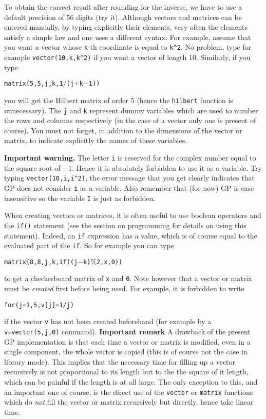 To obtain the correct result after rounding for the inverse, we have to use
a default precision of 56 digits (try it).
\smallskip
Although vectors and matrices can be entered manually, by typing explicitly
their elements, very often the elements satisfy a simple law and one uses a
different syntax. For example, assume that you want a vector whose {\tt k}-th
coordinate is equal to {\tt k\^{}2}. No problem, type for example
{\tt vector(10,k,k\^{}2)} if you want a vector of length 10. Similarly, if
you type 

\centerline{{\tt matrix(5,5,j,k,1$/$(j$+$k$-$1))}}

\noindent you will get the Hilbert
matrix of order 5 (hence the {\tt hilbert} function is unnecessary).
The {\tt j} and {\tt k} represent dummy variables which are used to number
the rows and columns respectively (in the case of a vector only one is present
of course). You must not forget, in addition to the dimensions of the vector
or matrix, to indicate explicitly the names of these variables.

{\bf Important warning.} The letter {\tt i} is reserved for the complex number
equal to the square root of $-1$. Hence it is absolutely forbidden to use it
as a variable. Try typing {\tt vector(10,i,i\^{}2)}, the error message that you
get clearly indicates that GP does not consider {\tt i} as a variable.
Also remember that (for now) GP is case insensitive so the variable {\tt I} is
just as forbidden.

When creating vectors or matrices, it is often useful to use boolean operators
and the {\tt if()} statement (see the section on programming for details on
using this statement). Indeed, an {\tt if} expression has a value, which is of
course equal to the evaluated part of the {\tt if}. So for example you can
type

\centerline{{\tt matrix(8,8,j,k,if((j$-$k)$\%$2,x,0))} }

to get a checkerboard matrix of {\tt x} and {\tt 0}. Note however that a
vector or matrix must be {\it created} first before being used. For example,
it is forbidden to write 

\centerline{{\tt for(j=1,5,v[j]=1/j)}}

if the vector {\tt v} has not been created beforehand (for example by a
{\tt v=vector(5,j,0)} command).
\medskip
{\bf Important remark}
\medskip
A drawback of the present GP implementation is that each time a vector or
matrix is modified, even in a single component, the whole vector is copied
(this is of course not the case in library mode). This implies that the 
necessary time for filling up a vector recursively is not proportional to
its length but to the the square of it length, which can be painful if the
length is at all large. The only exception to this, and an important one of
course, is the direct use of the {\tt vector} or {\tt matrix} functions which
do {\it not} fill the vector or matrix recursively but directly, hence take
linear time.

